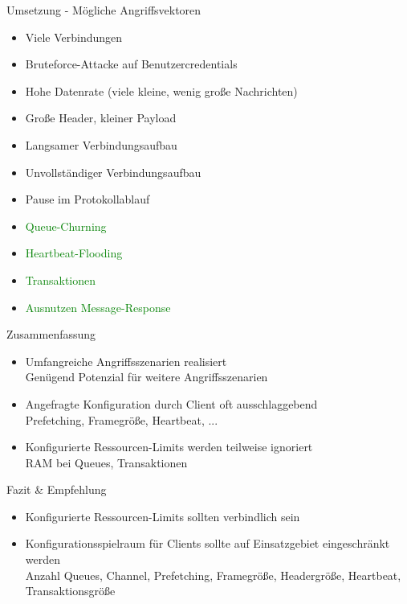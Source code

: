 \documentclass[10pt]{beamer}
\newcommand{\ok}{\textcolor{green}{\ding{52}}}
\newcommand{\nok}{\textcolor{red}{\ding{54}}}
\begin{document}
\begin{frame}[t]{Umsetzung - Mögliche Angriffsvektoren}
	\begin{itemize}
		\item Viele Verbindungen \uncover<2->{\textcolor{green}{+ Viele Channel} \ok}
		\item Bruteforce-Attacke auf Benutzercredentials \uncover<2->{\nok}
		\item Hohe Datenrate (viele kleine, wenig große Nachrichten) \uncover<2->{\ok}
		\item Große Header, kleiner Payload \uncover<2->{\ok}
		\item Langsamer Verbindungsaufbau  \uncover<2->{\textcolor{green}{+ Verbindungsabbau} \ok}
		\item Unvollständiger Verbindungsaufbau \uncover<2->{\textcolor{blue}{\Large\textasciitilde}}
		\item Pause im Protokollablauf \uncover<2->{\textcolor{blue}{\Large\textasciitilde}}
		\item<2-> \textcolor{green}{Queue-Churning}
		\item<2-> \textcolor{green}{Heartbeat-Flooding}
		\item<2-> \textcolor{green}{Transaktionen}
		\item<2-> \textcolor{green}{Ausnutzen Message-Response}
	\end{itemize}	
\end{frame}
  
\begin{frame}[t]{Zusammenfassung}
	\begin{itemize}
		\item Umfangreiche Angriffsszenarien realisiert\\
			 Genügend Potenzial für weitere Angriffsszenarien
		\item Angefragte Konfiguration durch Client oft ausschlaggebend \\
			 Prefetching, Framegröße, Heartbeat, ...
		\item Konfigurierte Ressourcen-Limits werden teilweise ignoriert \\
			 RAM bei Queues, Transaktionen\medskip
	\end{itemize}	
\end{frame}

\begin{frame}[t]{Fazit \& Empfehlung}
	\begin{itemize}
		\item Konfigurierte Ressourcen-Limits sollten verbindlich sein
		\item Konfigurationsspielraum für Clients sollte auf Einsatzgebiet eingeschränkt werden\\
		 Anzahl Queues, Channel, Prefetching, Framegröße, Headergröße, Heartbeat, Transaktionsgröße
	\end{itemize}
\end{frame}
\end{document}
